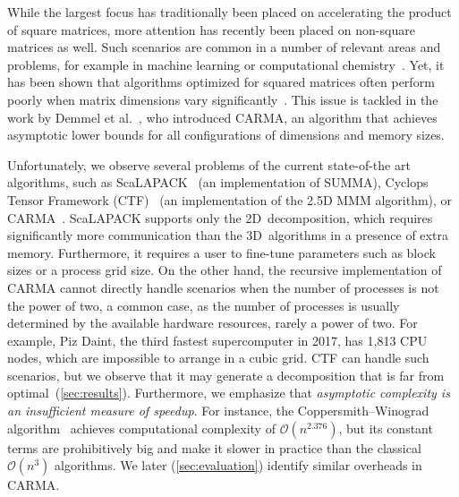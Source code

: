 \documentclass[sigplan,review,anonymous,10pt]{acmart}\settopmatter{printfolios=true,printccs=false,printacmref=false}
\newcommand\greg[1]{\textcolor{blue}{[Greg: #1]}}
\newcommand\mac[1]{\textcolor{red}{[Mac: #1]}}
\begin{document}
While the largest focus has traditionally been
placed on accelerating the product of square matrices, more attention has
recently been placed on
non-square matrices as well. Such scenarios are common in a number of
relevant areas and problems, for example in machine learning
\cite{rectangularML} or computational chemistry~\cite{rectangularChemistry}.
%
Yet, it has been shown
that algorithms optimized for squared matrices often perform poorly
when matrix dimensions vary significantly~\cite{CARMA}. 
%
This issue is tackled in the work by Demmel et al.~\cite{CARMA}, who introduced
CARMA, an algorithm that achieves asymptotic lower bounds for all
configurations of dimensions and memory sizes.  


%

Unfortunately, we observe several problems of the current state-of-the art
algorithms, such as ScaLAPACK~\cite{scalapack} (an implementation of
SUMMA), Cyclops Tensor Framework (CTF)~\cite{cyclops} (an implementation of the 
2.5D MMM algorithm), or CARMA~\cite{CARMA}. ScaLAPACK supports
only the 2D~decomposition, which requires significantly more communication than 
the 3D~algorithms in a presence of extra memory. Furthermore, it requires a 
user to
fine-tune parameters such as block sizes or a process
grid size. On the other hand, the recursive
implementation of CARMA cannot directly handle scenarios when the number of
processes is not the power of two, a common
case, as the number of processes is usually determined by the available
hardware resources, rarely a power of two.  For example, Piz Daint, the
third fastest supercomputer in 2017, has 1,813 CPU nodes, which are
impossible to arrange in a cubic grid. CTF can handle such scenarios, but we 
observe that it may generate a decomposition that is far from 
optimal~(\cref{sec:results}).  Furthermore, we emphasize that 
\emph{asymptotic 
complexity is an insufficient measure of speedup}. For instance, the
Coppersmith--Winograd algorithm~\cite{coppersmith} achieves computational
complexity of $\mathcal{O}(n^{2.376})$, but its constant terms are 
prohibitively big and
make it slower in practice than the classical $\mathcal{O}(n^{3})$ algorithms. 
We later (\cref{sec:evaluation}) identify similar overheads in CARMA. 
\end{document}
